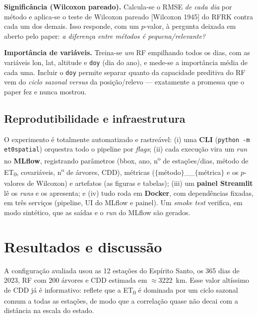 \textbf{Significância (Wilcoxon pareado).} Calcula-se o RMSE \emph{de cada dia} por
método e aplica-se o teste de Wilcoxon pareado [Wilcoxon 1945] do RFRK contra cada
um dos demais. Isso responde, com um $p$-valor, à pergunta deixada em aberto pelo
paper: \emph{a diferença entre métodos é pequena/relevante?}

\textbf{Importância de variáveis.} Treina-se \emph{um} RF empilhando todos os dias,
com as variáveis lon, lat, altitude e \texttt{doy} (dia do ano), e mede-se a
importância média de cada uma. Incluir o \texttt{doy} permite separar quanto da
capacidade preditiva do RF vem do \emph{ciclo sazonal} \emph{versus} da
posição/relevo --- exatamente a promessa que o paper fez e nunca mostrou.

\subsection{Reprodutibilidade e infraestrutura}

O experimento é totalmente automatizado e rastreável: (i) uma \textbf{CLI}
(\texttt{python -m et0spatial}) orquestra todo o pipeline por \emph{flags};
(ii) cada execução vira um \emph{run} no \textbf{MLflow}, registrando parâmetros
(bbox, ano, n\textsuperscript{o} de estações/dias, método de ET\textsubscript{0},
covariáveis, n\textsuperscript{o} de árvores, CDD), métricas
($\{$método$\}$\_\_$\{$métrica$\}$ e os $p$-valores de Wilcoxon) e artefatos (as
figuras e tabelas); (iii) um \textbf{painel Streamlit} lê os \emph{runs} e os
apresenta; e (iv) tudo roda em \textbf{Docker}, com dependências fixadas, em três
serviços (pipeline, UI do MLflow e painel). Um \emph{smoke test} verifica, em modo
sintético, que as saídas e o \emph{run} do MLflow são gerados.

\section{Resultados e discussão}

A configuração avaliada usou as 12 estações do Espírito Santo, os 365 dias de 2023,
RF com 200 árvores e CDD estimada em $\approx$3222~km. Esse valor altíssimo de CDD
já é informativo: reflete que a ET\textsubscript{0} é dominada por um ciclo sazonal
comum a todas as estações, de modo que a correlação quase não decai com a distância
na escala do estado.

